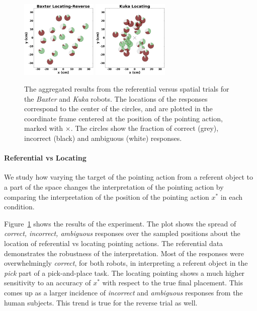 \documentclass[letterpaper]{article} %
\begin{document}
\begin{figure}[ht!]
    \includegraphics[width=0.325\textwidth ]{baxter_Locating-Reverse_.png}
    \includegraphics[width=0.325\textwidth ]{kuka_Locating_.png}
    \caption{The aggregated results from the referential versus spatial trials for the \textit{Baxter} and \textit{Kuka} robots. The locations of the responses correspond to the center of the circles, and are plotted in the coordinate frame centered at the position of the pointing action, marked with $\times$. The circles show the fraction of correct (grey), incorrect (black) and ambiguous (white) responses.}
    \label{fig:aggregatesimple}
\end{figure}

\paragraph{Referential vs Locating}
We study how varying the target of the pointing action from a referent object to a part of the space changes the interpretation of the pointing action by comparing the interpretation of the position of the pointing action $x^*$ in each condition. 

Figure~\ref{fig:aggregatesimple} shows the results of the experiment. The plot shows the spread of \textit{correct, incorrect, ambiguous} responses over the sampled positions about the location of referential vs locating pointing actions. The referential data demonstrates the robustness of the interpretation. Most of the responses were overwhelmingly \textit{correct}, for both robots, in interpreting a referent object in the \textit{pick} part of a pick-and-place task. The locating pointing shows a much higher sensitivity to an accuracy of $x^*$ with respect to the true final placement. This comes up as a larger incidence of \textit{incorrect} and \textit{ambiguous} responses from the human subjects. This trend is true for the reverse trial as well.
\end{document}

